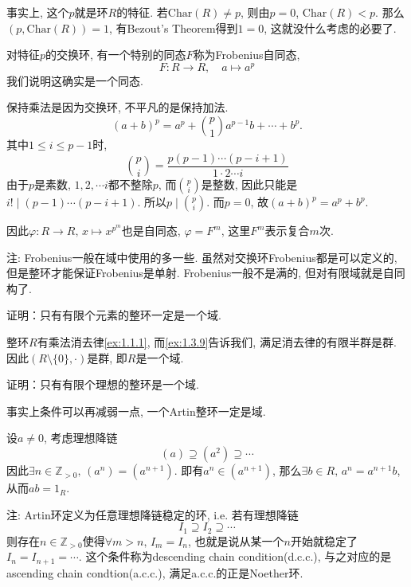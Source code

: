 \begin{solution}
    事实上, 这个$p$就是环$R$的特征. 若$\mathrm{Char}(R) \neq p$, 则由$p = 0$, $\mathrm{Char}(R) < p$.
    那么$(p, \mathrm{Char}(R)) = 1$, 有Bezout's Theorem得到$1 = 0$, 这就没什么考虑的必要了.

    对特征$p$的交换环, 有一个特别的同态$F$称为Frobenius自同态,
    \[
        F: R \to R, \quad a \mapsto a^p
    \]
    我们说明这确实是一个同态.
    
    保持乘法是因为交换环, 不平凡的是保持加法.
    \[
        (a + b)^p = a^p + \binom{p}{1}a^{p - 1}b + \cdots + b^p.
    \]
    其中$1 \leqslant i \leqslant p - 1$时,
    \[
        \binom{p}{i} = \frac{p(p - 1) \cdots (p - i + 1)}{1 \cdot 2 \cdots i} 
    \]
    由于$p$是素数, $1, 2, \cdots i$都不整除$p$, 而$\binom{p}{i}$是整数, 因此只能是$i! \mid (p - 1) \cdots (p - i + 1)$. 所以$p \mid \binom{p}{i}$. 而$p = 0$, 故$(a + b)^p = a^p + b^p$.

    因此$\varphi: R \to R,\, x \mapsto x^{p^m}$也是自同态, $\varphi = F^m$, 这里$F^m$表示复合$m$次.

注: Frobenius一般在域中使用的多一些. 虽然对交换环Frobenius都是可以定义的, 但是整环才能保证Frobenius是单射. Frobenius一般不是满的, 但对有限域就是自同构了.
\end{solution}

\begin{problem}
    证明：只有有限个元素的整环一定是一个域.
\end{problem}

\begin{solution}
    整环$R$有乘法消去律\ref{ex:1.1.1}, 而\ref{ex:1.3.9}告诉我们, 满足消去律的有限半群是群. 因此$(R \setminus \{0\}, \cdot)$是群, 即$R$是一个域.
\end{solution}

\begin{problem}\label{ex:2.1.4}
    证明：只有有限个理想的整环是一个域.
\end{problem}

\begin{solution}
    事实上条件可以再减弱一点, 一个Artin整环一定是域.

    设$a \neq 0$, 考虑理想降链
    \[
        (a) \supseteq (a^2) \supseteq \cdots 
    \]
    因此$\exists n \in \mathbb{Z}_{>0},\, (a^n) = (a^{n + 1})$. 即有$a^n \in (a^{n + 1})$, 那么$\exists b \in R,\, a^n = a^{n + 1}b$, 从而$ab = 1_R$.

注: Artin环定义为任意理想降链稳定的环, i.e. 若有理想降链
\[
    I_1 \supseteq I_2 \supseteq \cdots 
\]
则存在$n \in \mathbb{Z}_{>0}$使得$\forall m > n,\, I_m = I_n$, 也就是说从某一个$n$开始就稳定了$I_n = I_{n + 1} = \cdots$.
这个条件称为descending chain condition(d.c.c.), 与之对应的是ascending chain condtion(a.c.c.), 满足a.c.c.的正是Noether环.
\end{solution}

